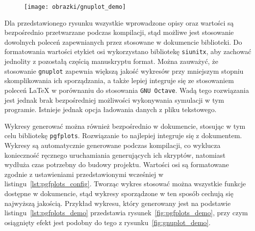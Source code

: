 \begin{listing}[hbt]
\inputminted{gnuplot}{skrypty/gnuplot_demo.gnuplot}
\end{listing}

\begin{figure}[!htb]
\texttt{[image: obrazki/gnuplot\_demo]}
\end{figure}

Dla przedstawionego rysunku wszystkie wprowadzone opisy oraz wartości są bezpośrednio przetwarzane podczas kompilacji, stąd możliwe jest stosowanie dowolnych poleceń zapewnianych przez stosowane w dokumencie biblioteki. Do formatowania wartości etykiet osi wykorzystano bibliotekę \texttt{siunitx}, aby zachować jednolity z pozostałą częścią manuskryptu format. Można zauważyć, że stosowanie \texttt{gnuplot} zapewnia większą jakość wykresów przy mniejszym stopniu skomplikowania ich sporządzania, a także lepiej integruje się ze stosowaniem poleceń \LaTeX{} w porównaniu do stosowania \texttt{GNU Octave}. Wadą tego rozwiązania jest jednak brak bezpośredniej możliwości wykonywania symulacji w tym programie. Istnieje jednak opcja ładowania danych z pliku tekstowego.

Wykresy generować można również bezpośrednio w dokumencie, stosując w tym celu bibliotekę \texttt{pgfplots}. Rozwiązanie to najlepiej integruje się z dokumentem. Wykresy są automatycznie generowane podczas kompilacji, co wyklucza konieczność ręcznego uruchamiania generujących ich skryptów, natomiast wydłuża czas potrzebny do budowy projektu. Wartości osi są formatowane zgodnie z ustawieniami przedstawionymi wcześniej w listingu~\ref{lst:pgfplots_config}. Tworząc wykres stosować można wszystkie funkcje dostępne w dokumencie, stąd wykresy sporządzone w ten sposób cechują się najwyższą jakością. Przykład wykresu, który generowany jest na podstawie listingu~\ref{lst:pgfplots_demo} przedstawia rysunek~\ref{fig:pgfplots_demo}, przy czym osiągnięty efekt jest podobny do tego z rysunku~\ref{fig:gnuplot_demo}.

\begin{listing}[hbt]
\inputminted{latex}{obrazki/pgfplots_demo.tex}
\end{listing}


